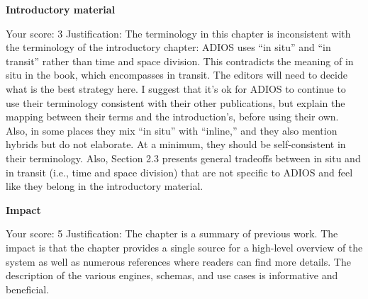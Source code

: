 \noindent\textbf{Introductory material}

Your score: 3
Justification: The terminology in this chapter is inconsistent with the terminology of the introductory chapter: ADIOS uses “in situ” and “in transit” rather than time and space division. This contradicts the meaning of in situ in the book, which encompasses in transit. The editors will need to decide what is the best strategy here. I suggest that it’s ok for ADIOS to continue to use their terminology consistent with their other publications, but explain the mapping between their terms and the introduction’s, before using their own. Also, in some places they mix “in situ” with “inline,” and they also mention hybrids but do not elaborate. At a minimum, they should be self-consistent in their terminology. Also, Section 2.3 presents general tradeoffs between in situ and in transit (i.e., time and space division) that are not specific to ADIOS and feel like they belong in the introductory material.

\noindent\textbf{Impact}

Your score: 5
Justification: The chapter is a summary of previous work. The impact is that the chapter provides a single source for a high-level overview of the system as well as numerous references where readers can find more details. The description of the various engines, schemas, and use cases is informative and beneficial.

